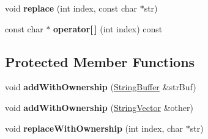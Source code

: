 \begin{DoxyCompactItemize}
\item 
\hypertarget{classCONFIG4CPP__NAMESPACE_1_1StringVector_aca271e763a621a2e6cea11e1e7ed59ee}{void {\bfseries replace} (int index, const char $\ast$str)}\label{classCONFIG4CPP__NAMESPACE_1_1StringVector_aca271e763a621a2e6cea11e1e7ed59ee}

\item 
\hypertarget{classCONFIG4CPP__NAMESPACE_1_1StringVector_a923d6ddb31195b17b37a2ce443c29a34}{const char $\ast$ {\bfseries operator\mbox{[}$\,$\mbox{]}} (int index) const }\label{classCONFIG4CPP__NAMESPACE_1_1StringVector_a923d6ddb31195b17b37a2ce443c29a34}

\end{DoxyCompactItemize}
\subsection*{Protected Member Functions}
\begin{DoxyCompactItemize}
\item 
\hypertarget{classCONFIG4CPP__NAMESPACE_1_1StringVector_ac0404c51c2e1bfa2713577ca252dd642}{void {\bfseries add\-With\-Ownership} (\hyperlink{classCONFIG4CPP__NAMESPACE_1_1StringBuffer}{String\-Buffer} \&str\-Buf)}\label{classCONFIG4CPP__NAMESPACE_1_1StringVector_ac0404c51c2e1bfa2713577ca252dd642}

\item 
\hypertarget{classCONFIG4CPP__NAMESPACE_1_1StringVector_a86f144a67d2ee1e002865878717ac256}{void {\bfseries add\-With\-Ownership} (\hyperlink{classCONFIG4CPP__NAMESPACE_1_1StringVector}{String\-Vector} \&other)}\label{classCONFIG4CPP__NAMESPACE_1_1StringVector_a86f144a67d2ee1e002865878717ac256}

\item 
\hypertarget{classCONFIG4CPP__NAMESPACE_1_1StringVector_a3860d4e9dc3d3b2f84f089fe4631a189}{void {\bfseries replace\-With\-Ownership} (int index, char $\ast$str)}\label{classCONFIG4CPP__NAMESPACE_1_1StringVector_a3860d4e9dc3d3b2f84f089fe4631a189}

\end{DoxyCompactItemize}
